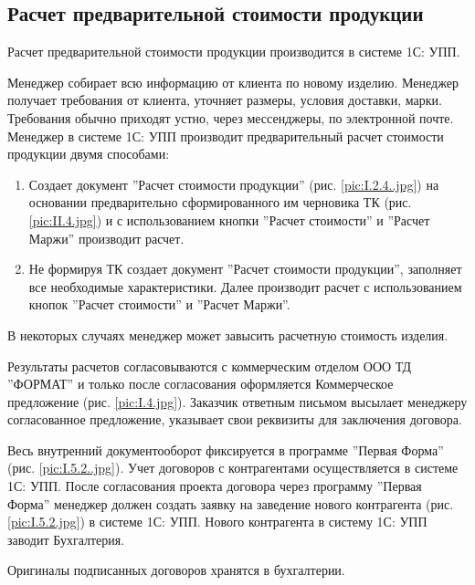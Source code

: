 \newpage
\subsection{Расчет предварительной стоимости продукции}
\label{bp:calculation}

Расчет предварительной стоимости продукции производится в системе 1С: УПП. 

Менеджер собирает всю информацию от клиента по новому изделию. 
Менеджер получает требования от клиента, уточняет размеры, условия доставки, марки. Требования обычно приходят устно, через мессенджеры, по электронной почте.
Менеджер в системе 1С: УПП производит предварительный расчет стоимости продукции двумя способами:
\begin{enumerate}
    \item Создает документ ''Расчет стоимости продукции'' (рис. \ref{pic:I.2.4..jpg}) на основании предварительно сформированного им черновика ТК (рис. \ref{pic:II.4.jpg}) и с использованием кнопки ''Расчет стоимости'' и ''Расчет Маржи'' производит расчет.
    \item Не формируя ТК создает документ ''Расчет стоимости продукции'', заполняет все необходимые характеристики. Далее производит расчет с использованием кнопок ''Расчет стоимости'' и ''Расчет Маржи''.
\end{enumerate}

В некоторых случаях менеджер может завысить расчетную стоимость изделия. 

Результаты расчетов согласовываются с коммерческим отделом ООО ТД ''ФОРМАТ'' и только после согласования оформляется Коммерческое предложение (рис. \ref{pic:I.4.jpg}).
Заказчик ответным письмом высылает менеджеру согласованное предложение, указывает свои реквизиты 
для заключения договора. 

Весь внутренний документооборот фиксируется в программе ''Первая Форма'' (рис. \ref{pic:I.5.2..jpg}).
Учет договоров с контрагентами осуществляется в системе 1С: УПП.
После согласования проекта договора через программу ''Первая Форма'' менеджер должен создать заявку на заведение нового контрагента (рис. \ref{pic:I.5.2.jpg}) в системе 1С: УПП.
Нового контрагента в систему 1С: УПП заводит Бухгалтерия.

Оригиналы подписанных договоров хранятся в бухгалтерии.






